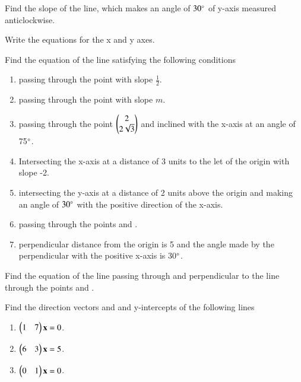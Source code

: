 \item Find the slope of the line, which makes an angle of $30\degree$ of y-axis measured anticlockwise.
\item Write the equations for the x and y axes.
\item Find the equation of the line satisfying the following conditions 
\begin{enumerate}
\item passing through  the point  with slope $\frac{1}{2}$.
\item passing through the point  with slope $m$.
\item passing through the point $\begin{pmatrix}2\\2\sqrt{3}\end{pmatrix}$ and inclined with the x-axis at an angle of 75$\degree$.
\item Intersecting the x-axis at a distance of 3 units to the let of the origin with slope -2.
\item intersecting the y-axis at a distance of 2 units above the origin and making an angle of $30\degree$ with the positive direction of the x-axis.
\item passing through the points  and .
\item perpendicular distance from the origin is 5 and the angle made by the perpendicular with the positive x-axis is 30$\degree$.
\end{enumerate}
%
\solution



\item Find the equation of the line passing through  and perpendicular to the line through the points  and .
\item Find the direction vectors and and y-intercepts  of the following lines 
\begin{enumerate}
\item $\begin{pmatrix}1 & 7\end{pmatrix}\mathbf{x} = 0$.
\item $\begin{pmatrix}6 & 3\end{pmatrix}\mathbf{x} = 5$.
\item $\begin{pmatrix}0 & 1\end{pmatrix}\mathbf{x} = 0$.
\end{enumerate}

